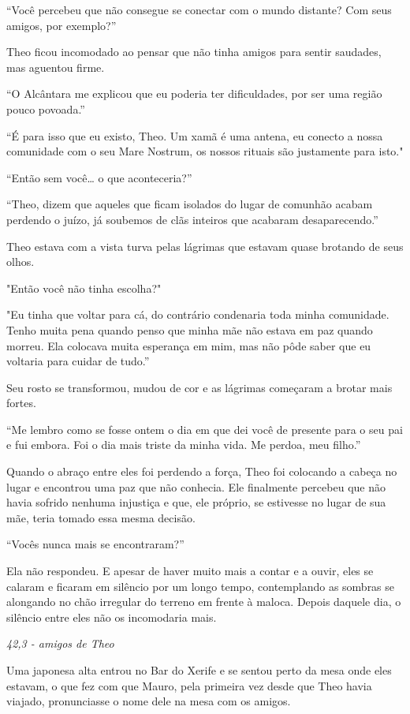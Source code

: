 ``Você percebeu que não consegue se conectar com o mundo distante? Com
seus amigos, por exemplo?''

Theo ficou incomodado ao pensar que não tinha amigos para sentir
saudades, mas aguentou firme.

``O Alcântara me explicou que eu poderia ter dificuldades, por ser uma
região pouco povoada.''

``É para isso que eu existo, Theo. Um xamã é uma antena, eu conecto a
nossa comunidade com o seu Mare Nostrum, os nossos rituais são
justamente para isto."

``Então sem você\ldots{} o que aconteceria?''

``Theo, dizem que aqueles que ficam isolados do lugar de comunhão acabam
perdendo o juízo, já soubemos de clãs inteiros que acabaram
desaparecendo.''

Theo estava com a vista turva pelas lágrimas que estavam quase brotando
de seus olhos.

"Então você não tinha escolha?"

"Eu tinha que voltar para cá, do contrário condenaria toda minha
comunidade. Tenho muita pena quando penso que minha mãe não estava em
paz quando morreu. Ela colocava muita esperança em mim, mas não pôde
saber que eu voltaria para cuidar de tudo.''

Seu rosto se transformou, mudou de cor e as lágrimas começaram a brotar
mais fortes.

``Me lembro como se fosse ontem o dia em que dei você de presente para o
seu pai e fui embora. Foi o dia mais triste da minha vida. Me perdoa,
meu filho.''

Quando o abraço entre eles foi perdendo a força, Theo foi colocando a
cabeça no lugar e encontrou uma paz que não conhecia. Ele finalmente
percebeu que não havia sofrido nenhuma injustiça e que, ele próprio, se
estivesse no lugar de sua mãe, teria tomado essa mesma decisão.

``Vocês nunca mais se encontraram?''

Ela não respondeu. E apesar de haver muito mais a contar e a ouvir, eles
se calaram e ficaram em silêncio por um longo tempo, contemplando as
sombras se alongando no chão irregular do terreno em frente à maloca.
Depois daquele dia, o silêncio entre eles não os incomodaria mais.

\asterisc

\emph{42,3 - amigos de Theo}

Uma japonesa alta entrou no Bar do Xerife e se sentou perto da mesa onde
eles estavam, o que fez com que Mauro, pela primeira vez desde que Theo
havia viajado, pronunciasse o nome dele na mesa com os amigos.

